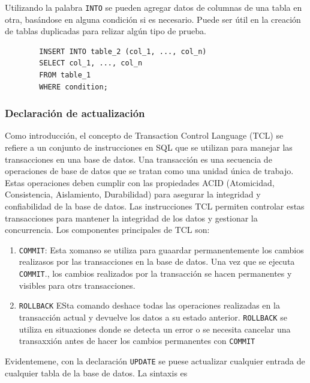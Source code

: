         Utilizando la palabra \texttt{INTO} se pueden agregar datos de columnas de una tabla en otra, basándose en alguna condición si es necesario. Puede ser útil en la creación de tablas duplicadas para relizar algún tipo de prueba.

        \begin{verbatim}
        INSERT INTO table_2 (col_1, ..., col_n)
        SELECT col_1, ..., col_n
        FROM table_1
        WHERE condition;
        \end{verbatim}

        \subsubsection{Declaración de actualización}

            Como introducción, el concepto de Transaction Control Language (TCL) se refiere a un conjunto de instrucciones en SQL que se utilizan para manejar las transacciones en una base de datos. Una transacción es una secuencia de operaciones de base de datos que se tratan como una unidad única de trabajo. Estas operaciones deben cumplir con las propiedades ACID (Atomicidad, Consistencia, Aislamiento, Durabilidad) para asegurar la integridad y confiabilidad de la base de datos. Las instrucciones TCL permiten controlar estas transacciones para mantener la integridad de los datos y gestionar la concurrencia. Los componentes principales de TCL son:

            \begin{enumerate}
                \item \texttt{COMMIT}: Esta xomanso se utiliza para guaardar permanentemente los cambios realizasos por las transacciones en la base de datos. Una vez que se ejecuta \texttt{COMMIT}., los cambios realizados por la transacción se hacen permanentes y visibles para otrs transacciones.
                \item \texttt{ROLLBACK} ESta comando deshace todas las operaciones realizadas en la transacción actual y devuelve los datos a su estado anterior. \texttt{ROLLBACK} se utiliza en situaxiones donde se detecta un error o se necesita cancelar una transaxxión antes de hacer los cambios permanentes con \texttt{COMMIT}
            \end{enumerate}

            Evidentemene, con la declaración \texttt{UPDATE} se puese actualizar cualquier entrada de cualquier tabla de la base de datos. La sintaxis es

